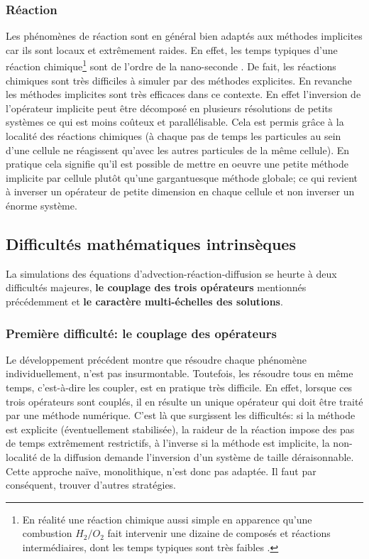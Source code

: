 \subsubsection{Réaction}
    Les phénomènes de réaction sont en général bien adaptés aux méthodes implicites car ils sont locaux et extrêmement raides.
    En effet, les temps typiques d'une réaction chimique\footnote{
    En réalité une réaction chimique aussi simple en apparence qu'une combustion $H_2/O_2$ fait intervenir une dizaine de composés et réactions intermédiaires, dont les temps typiques sont très faibles \cite{}.} sont de l'ordre de la nano-seconde \cite{}.
    De fait, les réactions chimiques sont très difficiles à simuler par des méthodes explicites.
    En revanche les méthodes implicites sont très efficaces dans ce contexte. En effet l'inversion de l'opérateur implicite 
    peut être décomposé en plusieurs résolutions de petits systèmes ce qui est moins coûteux et parallélisable. Cela est permis grâce à la localité des réactions chimiques
    (à chaque pas de temps les particules au sein d'une cellule ne réagissent qu'avec les autres particules de la même cellule).
    En pratique cela signifie qu'il est possible de mettre en oeuvre une petite méthode implicite par cellule plutôt qu'une gargantuesque méthode globale; 
    ce qui revient à inverser un opérateur de petite dimension en chaque cellule et non inverser un énorme système.

\subsection{Difficultés mathématiques intrinsèques}\label{par:adr_difficile}
    La simulations des équations d'advection-réaction-diffusion se heurte à deux difficultés majeures, \textbf{le couplage des trois opérateurs} mentionnés précédemment
    et \textbf{le caractère multi-échelles des solutions}.

    \subsubsection{Première difficulté: le couplage des opérateurs}
        Le développement précédent montre que résoudre chaque phénomène individuellement, n'est pas insurmontable. 
        Toutefois, les résoudre tous en même temps, c'est-à-dire les coupler, est en pratique très difficile.
        En effet, lorsque ces trois opérateurs sont couplés, il en résulte un unique opérateur qui doit être traité par une méthode numérique.
        C'est là que surgissent les difficultés: si la méthode est explicite (éventuellement stabilisée), la raideur de la réaction impose des pas de temps extrêmement restrictifs,
        à l'inverse si la méthode est implicite, la non-localité de la diffusion demande l'inversion d'un système de taille déraisonnable. 
        Cette approche naïve, monolithique, n'est donc pas adaptée. Il faut par conséquent, trouver d'autres stratégies.

